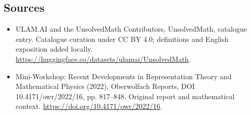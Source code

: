 \documentclass[11pt]{article}
\begin{document}
\subsection{Sources}
\begin{itemize}
\item[\hypertarget{source:statement:1}{S1}] ULAM.AI and the UnsolvedMath Contributors, UnsolvedMath, catalogue entry. Catalogue curation under CC BY 4.0; definitions and English exposition added locally.
\url{https://huggingface.co/datasets/ulamai/UnsolvedMath}.
\item[\hypertarget{source:statement:2}{S2}] Mini-Workshop: Recent Developments in Representation Theory and Mathematical Physics (2022), Oberwolfach Reports, DOI 10.4171/owr/2022/16, pp. 817--848. Original report and mathematical context.
\url{https://doi.org/10.4171/owr/2022/16}.
\end{itemize}
\label{end:statement}
\end{document}
